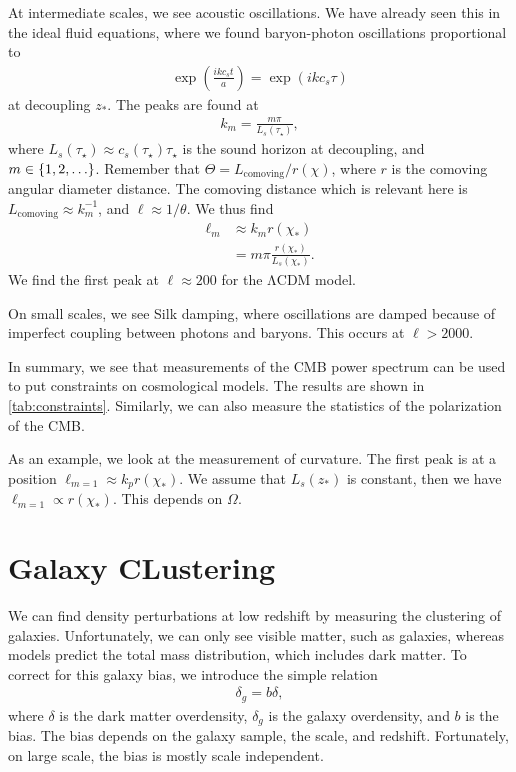 At intermediate scales, we see acoustic oscillations. We have already seen this in the ideal fluid equations, where we found baryon-photon oscillations proportional to
\begin{align*}
	\exp(\frac{i k c_s t}{a})
	= \exp(i k c_s \tau)
\end{align*}
at decoupling $z_*$. The peaks are found at
\begin{align*}
	k_m = \frac{m \pi}{L_s(\tau_\star)},
\end{align*}
where $L_s(\tau_\star) \approx c_s(\tau_\star) \tau_\star$ is the sound horizon at decoupling, and $m \in \left\{ {1, 2, \dots} \right\}$.
Remember that $\Theta = L_\text{comoving} / r(\chi)$, where $r$ is the comoving angular diameter distance. The comoving distance which is relevant here is $L_\text{comoving} \approx k_m^{-1}$, and $\ell \approx 1/\theta$. We thus find
\begin{align*}
	\ell_m 
	&\approx k_m r(\chi_*)\\
	&= m \pi \frac{r(\chi_*)}{L_s(\chi_*)}.
\end{align*}
We find the first peak at $\ell \approx 200$ for the ΛCDM model.

On small scales, we see Silk damping, where oscillations are damped because of imperfect coupling between photons and baryons. This occurs at $\ell > 2000$.

In summary, we see that measurements of the CMB power spectrum can be used to put constraints on cosmological models. The results are shown in \cref{tab:constraints}. Similarly, we can also measure the statistics of the polarization of the CMB.


As an example, we look at the measurement of curvature. The first peak is at a position $\ell_{m=1} \approx k_p r(\chi_*)$. We assume that $L_s(z_*)$ is constant, then we have $\ell_{m=1} \propto r(\chi_*)$. This depends on $\Omega$.






\section{Galaxy CLustering}

We can find density perturbations at low redshift by measuring the clustering of galaxies. Unfortunately, we can only see visible matter, such as galaxies, whereas models predict the total mass distribution, which includes dark matter. To correct for this galaxy bias, we introduce the simple relation
\begin{align*}
	\delta_g = b \delta,
\end{align*}
where
$\delta$ is the dark matter overdensity,
$\delta_g$ is the galaxy overdensity,
and $b$ is the bias.
The bias depends on the galaxy sample, the scale, and redshift. Fortunately, on large scale, the bias is mostly scale independent.





